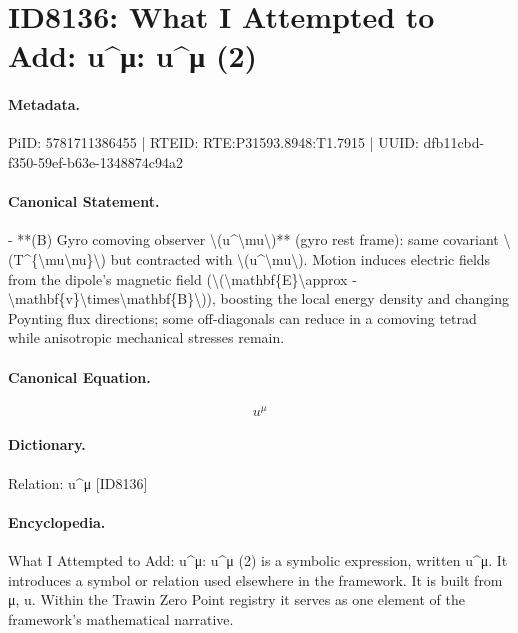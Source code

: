 \section*{ID8136: What I Attempted to Add: u\textasciicircum{}μ: u\textasciicircum{}μ (2)}
\paragraph{Metadata.}
PiID: 5781711386455 | RTEID: RTE:P31593.8948:T1.7915 | UUID: dfb11cbd-f350-59ef-b63e-1348874c94a2

\paragraph{Canonical Statement.}
- **(B) Gyro comoving observer \textbackslash{}(u\textasciicircum{}\textbackslash{}mu\textbackslash{})** (gyro rest frame): same covariant \textbackslash{}(T\textasciicircum{}\{\textbackslash{}mu\textbackslash{}nu\}\textbackslash{}) but contracted with \textbackslash{}(u\textasciicircum{}\textbackslash{}mu\textbackslash{}). Motion induces electric fields from the dipole’s magnetic field (\textbackslash{}(\textbackslash{}mathbf\{E\}\textbackslash{}approx -\textbackslash{}mathbf\{v\}\textbackslash{}times\textbackslash{}mathbf\{B\}\textbackslash{})), boosting the local energy density and changing Poynting flux directions; some off-diagonals can reduce in a comoving tetrad while anisotropic mechanical stresses remain.

\paragraph{Canonical Equation.}
\[
u^\mu
\]

\paragraph{Dictionary.}
Relation: u\textasciicircum{}μ [ID8136]

\paragraph{Encyclopedia.}
What I Attempted to Add: u\textasciicircum{}μ: u\textasciicircum{}μ (2) is a symbolic expression, written u\textasciicircum{}μ. It introduces a symbol or relation used elsewhere in the framework. It is built from μ, u. Within the Trawin Zero Point registry it serves as one element of the framework's mathematical narrative.
